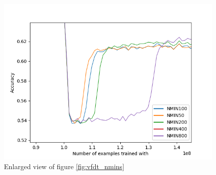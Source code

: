 \documentclass[12pt]{article}
\begin{document}
\begin{figure}
	\centering
	\includegraphics[width=.8\linewidth]{../code/experiments/vfdt/plots/vfdt_nmin_zoom.png}
	\caption{Enlarged view of figure \ref{fig:vfdt_nmins}}
	\label{fig:vfdt_nmins_zoom}	
\end{figure}
\end{document}
